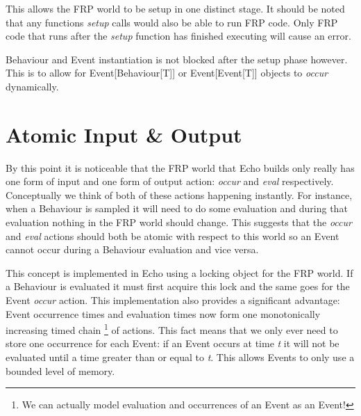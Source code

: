     This allows the FRP world to be setup in one distinct stage. It should be noted that
    any functions \emph{setup} calls would also be able to run FRP code. Only FRP code that runs
    after the \emph{setup} function has finished executing will cause an error.
    
    Behaviour and Event instantiation is not blocked after the setup phase however. This is
    to allow for Event[Behaviour[T]] or Event[Event[T]] objects to \emph{occur}
    dynamically.
    
  \section{Atomic Input \& Output}

     By this point it is noticeable that the FRP world that Echo builds only really has one form of input and one
     form of output action: \emph{occur} and \emph{eval} respectively. Conceptually we think of both of these
     actions happening instantly. For instance, when a Behaviour is sampled it will need to do some evaluation
     and during that evaluation nothing in the FRP world should change. This suggests that the \emph{occur}
     and \emph{eval} actions should both be atomic with respect to this world so an Event cannot occur during
     a Behaviour evaluation and vice versa. 

     This concept is implemented in Echo using a locking object for the FRP world. If a Behaviour is evaluated it
     must first acquire this lock and the same goes for the Event \emph{occur} action. This implementation
     also provides a significant advantage: Event occurrence times and evaluation times now form one
     monotonically increasing timed chain \footnote{We can actually model evaluation and occurrences of an Event as an 
     Event!} of actions. This fact means that we only ever need to store one occurrence for each Event: if an Event occurs
     at time \emph{t} it will not be evaluated until a time greater than or equal to \emph{t}. This allows
     Events to only use a bounded level of memory. 

